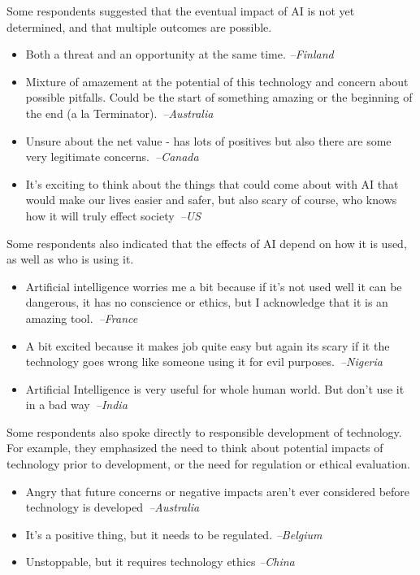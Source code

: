 \documentclass[11pt]{article} %
\newcommand\aff[1]{\textcolor{darkplum}{{\emph{--#1}}}}
\newenvironment{lq2}
{ \vspace{-3pt}
  \begin{itemize}[leftmargin = 4.0em, rightmargin=5.0em, label={}]
    \fontsize{10pt}{10.7pt}\selectfont
    \setlength{\itemsep}{3pt}
    \setlength{\parskip}{2.5pt}
    \setlength{\parsep}{3pt}     }
{ \end{itemize} \vspace{1pt}  }
\begin{document}
Some respondents suggested that the eventual impact of AI is not yet determined, and that multiple outcomes are possible.

\begin{lq2}
\item Both a threat and an opportunity at the same time. \aff{Finland}
\item Mixture of amazement at the potential of this technology and concern about possible pitfalls. Could be the start of something amazing or the beginning of the end (a la Terminator).~\aff{Australia}
\item Unsure about the net value - has lots of positives but also there are some very legitimate concerns.~\aff{Canada}
\item It's exciting to think about the things that could come about with AI that would make our lives easier and safer, but also scary of course, who knows how it will truly effect society~\aff{US}
\end{lq2}

Some respondents also indicated that the effects of AI depend on how it is used, as well as who is using it.

\begin{lq2}
\item Artificial intelligence worries me a bit because if it's not used well it can be dangerous, it has no conscience or ethics, but I acknowledge that it is an amazing tool.~\aff{France}
\item A bit excited because it makes job quite easy but again its scary if it the technology goes wrong like someone using it for evil purposes.~\aff{Nigeria}
\item Artificial Intelligence is very useful for whole human world. But don't use it in a bad way~\aff{India}
\end{lq2}

Some respondents also spoke directly to responsible development of technology. For example, they emphasized the need to think about potential impacts of technology prior to development, or the need for regulation or ethical evaluation.

\begin{lq2}
\item Angry that future concerns or negative impacts aren't ever considered before technology is developed~\aff{Australia}
\item It’s a positive thing, but it needs to be regulated. \aff{Belgium}
\item Unstoppable, but it requires technology ethics \aff{China}
\end{lq2}
\end{document}
